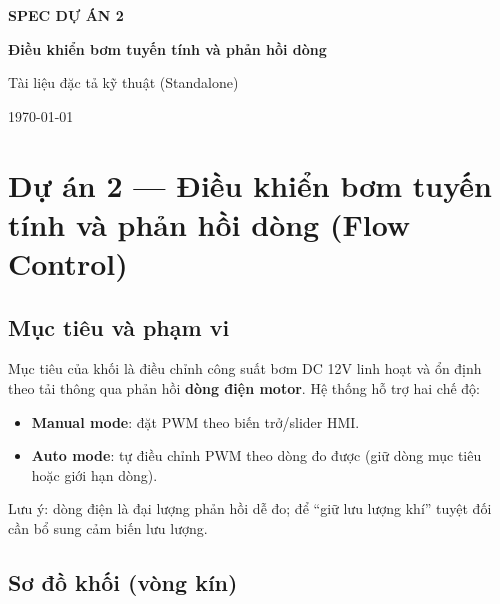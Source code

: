 \documentclass[12pt,a4paper]{report}
\begin{document}
\begin{titlepage}
\centering
\vspace*{2cm}

{\Large \textbf{SPEC DỰ ÁN 2}\par}
\vspace{0.5cm}
{\LARGE \textbf{Điều khiển bơm tuyến tính và phản hồi dòng}\par}

\vspace{1.5cm}
{\large Tài liệu đặc tả kỹ thuật (Standalone)\par}

\vfill
{\large \today\par}
\end{titlepage}

\tableofcontents
\clearpage

\chapter{Dự án 2 --- Điều khiển bơm tuyến tính và phản hồi dòng (Flow Control)}

\section{Mục tiêu và phạm vi}
Mục tiêu của khối là điều chỉnh công suất bơm DC 12V linh hoạt và ổn định theo tải thông qua phản hồi \textbf{dòng điện motor}. Hệ thống hỗ trợ hai chế độ:
\begin{itemize}
  \item \textbf{Manual mode}: đặt PWM theo biến trở/slider HMI.
  \item \textbf{Auto mode}: tự điều chỉnh PWM theo dòng đo được (giữ dòng mục tiêu hoặc giới hạn dòng).
\end{itemize}
Lưu ý: dòng điện là đại lượng phản hồi dễ đo; để ``giữ lưu lượng khí'' tuyệt đối cần bổ sung cảm biến lưu lượng.

\section{Sơ đồ khối (vòng kín)}
\end{document}
